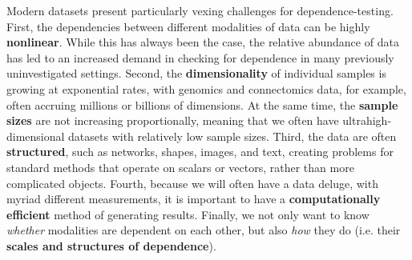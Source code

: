 \documentclass[11pt]{article}
\begin{document}
Modern datasets present particularly vexing challenges for dependence-testing.
%
First, the dependencies between different modalities of data can be highly \textbf{nonlinear}.  While this has always been the case, the relative abundance of data has led to an increased demand in checking for dependence in many previously uninvestigated settings.
%
Second, the \textbf{dimensionality} of individual samples is growing at exponential rates, with genomics and connectomics data, for example, often accruing millions or billions of dimensions. At the same time, the \textbf{sample sizes} are not increasing proportionally, meaning that we often have ultrahigh-dimensional datasets with relatively low sample sizes.
Third, the data are often \textbf{structured}, such as networks, shapes, images, and text, creating problems for standard methods that operate on scalars or vectors, rather than more complicated objects.
%
Fourth, because we will often have a data deluge, with myriad different measurements, it is important to have a  \textbf{computationally efficient} method of generating results.
%
Finally, 
we not only want to know \textit{whether}  modalities are dependent on each other, but also \textit{how} they do (i.e. their \textbf{scales and structures of dependence}).
\end{document}

